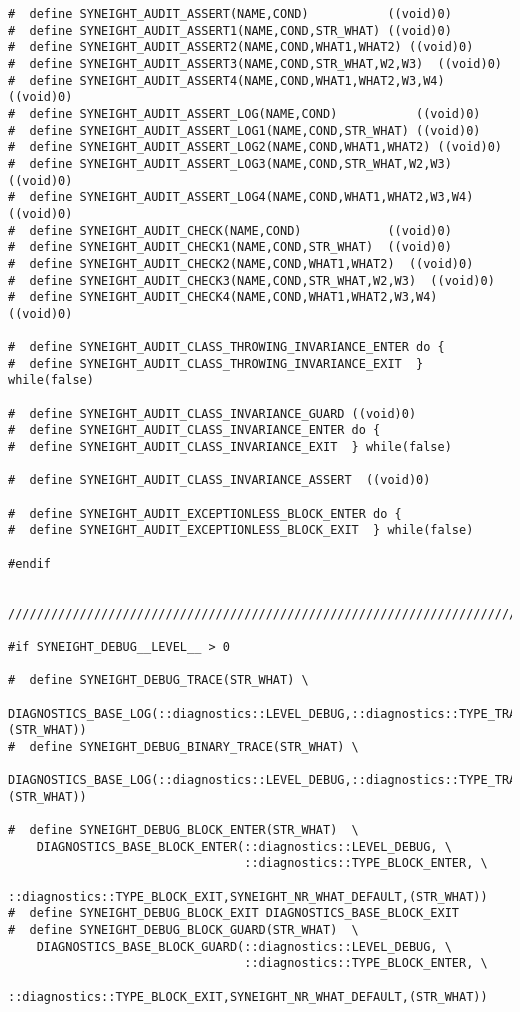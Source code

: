 \begin{verbatim}
#  define SYNEIGHT_AUDIT_ASSERT(NAME,COND)           ((void)0)
#  define SYNEIGHT_AUDIT_ASSERT1(NAME,COND,STR_WHAT) ((void)0)
#  define SYNEIGHT_AUDIT_ASSERT2(NAME,COND,WHAT1,WHAT2) ((void)0)
#  define SYNEIGHT_AUDIT_ASSERT3(NAME,COND,STR_WHAT,W2,W3)  ((void)0)
#  define SYNEIGHT_AUDIT_ASSERT4(NAME,COND,WHAT1,WHAT2,W3,W4)  ((void)0)
#  define SYNEIGHT_AUDIT_ASSERT_LOG(NAME,COND)           ((void)0)
#  define SYNEIGHT_AUDIT_ASSERT_LOG1(NAME,COND,STR_WHAT) ((void)0)
#  define SYNEIGHT_AUDIT_ASSERT_LOG2(NAME,COND,WHAT1,WHAT2) ((void)0)
#  define SYNEIGHT_AUDIT_ASSERT_LOG3(NAME,COND,STR_WHAT,W2,W3)  ((void)0)
#  define SYNEIGHT_AUDIT_ASSERT_LOG4(NAME,COND,WHAT1,WHAT2,W3,W4)  ((void)0)
#  define SYNEIGHT_AUDIT_CHECK(NAME,COND)            ((void)0)
#  define SYNEIGHT_AUDIT_CHECK1(NAME,COND,STR_WHAT)  ((void)0)
#  define SYNEIGHT_AUDIT_CHECK2(NAME,COND,WHAT1,WHAT2)  ((void)0)
#  define SYNEIGHT_AUDIT_CHECK3(NAME,COND,STR_WHAT,W2,W3)  ((void)0)
#  define SYNEIGHT_AUDIT_CHECK4(NAME,COND,WHAT1,WHAT2,W3,W4)  ((void)0)

#  define SYNEIGHT_AUDIT_CLASS_THROWING_INVARIANCE_ENTER do {
#  define SYNEIGHT_AUDIT_CLASS_THROWING_INVARIANCE_EXIT  } while(false)

#  define SYNEIGHT_AUDIT_CLASS_INVARIANCE_GUARD ((void)0)
#  define SYNEIGHT_AUDIT_CLASS_INVARIANCE_ENTER do {
#  define SYNEIGHT_AUDIT_CLASS_INVARIANCE_EXIT  } while(false)

#  define SYNEIGHT_AUDIT_CLASS_INVARIANCE_ASSERT  ((void)0)

#  define SYNEIGHT_AUDIT_EXCEPTIONLESS_BLOCK_ENTER do {
#  define SYNEIGHT_AUDIT_EXCEPTIONLESS_BLOCK_EXIT  } while(false)

#endif


////////////////////////////////////////////////////////////////////////////////

#if SYNEIGHT_DEBUG__LEVEL__ > 0

#  define SYNEIGHT_DEBUG_TRACE(STR_WHAT) \
    DIAGNOSTICS_BASE_LOG(::diagnostics::LEVEL_DEBUG,::diagnostics::TYPE_TRACE,SYNEIGHT_NR_WHAT_DEFAULT,(STR_WHAT))
#  define SYNEIGHT_DEBUG_BINARY_TRACE(STR_WHAT) \
    DIAGNOSTICS_BASE_LOG(::diagnostics::LEVEL_DEBUG,::diagnostics::TYPE_TRACE_BINARY,SYNEIGHT_NR_WHAT_DEFAULT,(STR_WHAT))

#  define SYNEIGHT_DEBUG_BLOCK_ENTER(STR_WHAT)  \
    DIAGNOSTICS_BASE_BLOCK_ENTER(::diagnostics::LEVEL_DEBUG, \
                                 ::diagnostics::TYPE_BLOCK_ENTER, \
                                 ::diagnostics::TYPE_BLOCK_EXIT,SYNEIGHT_NR_WHAT_DEFAULT,(STR_WHAT))
#  define SYNEIGHT_DEBUG_BLOCK_EXIT DIAGNOSTICS_BASE_BLOCK_EXIT
#  define SYNEIGHT_DEBUG_BLOCK_GUARD(STR_WHAT)  \
    DIAGNOSTICS_BASE_BLOCK_GUARD(::diagnostics::LEVEL_DEBUG, \
                                 ::diagnostics::TYPE_BLOCK_ENTER, \
                                 ::diagnostics::TYPE_BLOCK_EXIT,SYNEIGHT_NR_WHAT_DEFAULT,(STR_WHAT))


\end{verbatim}
